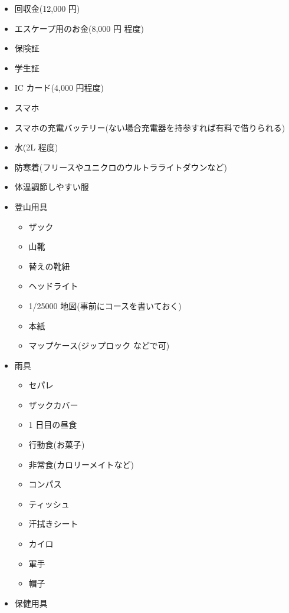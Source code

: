 \documentclass[b5paper,10pt]{ltjsarticle}
\newenvironment{checkbox}{%
    \begin{itemize}
    \renewcommand*{\labelitemi}{□}
    \renewcommand*{\labelitemii}{◯}
    \renewcommand*{\labelitemiii}{△}
}{%
    \end{itemize}
}
\begin{document}
\begin{multicols}{2}
    \begin{checkbox}
        \item 回収金(12,000 円)
        \item エスケープ用のお金(8,000 円 程度)
        \item 保険証
        \item 学生証
        \item IC カード(4,000 円程度)
        \item スマホ
        \item スマホの充電バッテリー(ない場合充電器を持参すれば有料で借りられる)
        \item 水(2L 程度)
        \item 防寒着(フリースやユニクロのウルトラライトダウンなど)
        \item 体温調節しやすい服
        \item 登山用具
        \begin{checkbox}
            \item ザック
            \item 山靴
            \item 替えの靴紐
            \item ヘッドライト
            \item 1/25000 地図(事前にコースを書いておく)
            \item 本紙
            \item マップケース(ジップロック などで可)
        \end{checkbox}
        \item 雨具
        \begin{checkbox}
            \item セパレ
            \item ザックカバー
            \item 1 日目の昼食
            \item 行動食(お菓子)
            \item 非常食(カロリーメイトなど)
            \item コンパス
            \item ティッシュ
            \item 汗拭きシート
            \item カイロ
            \item 軍手
            \item 帽子
        \end{checkbox}
        \item 保健用具

\end{checkbox}
\end{multicols}
\end{document}
